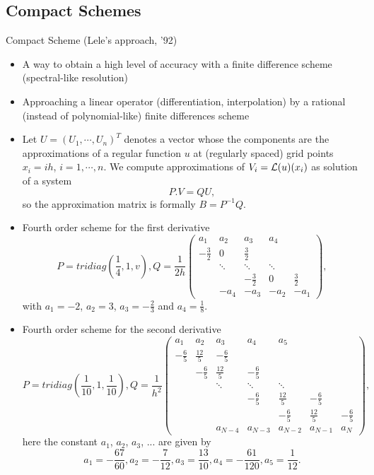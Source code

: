 \documentclass[hyperref={pdfpagemode=FullScreen},9pt]{beamer}
\begin{document}
 \subsection{Compact Schemes}
 \begin{frame}
 \begin{block}{Compact Scheme (Lele's approach, '92)}
 \begin{itemize}
 \item A way to obtain a high level of accuracy with a finite difference scheme
 (spectral-like resolution)
 \item Approaching a linear operator (differentiation, interpolation) by a rational (instead of polynomial-like) finite differences scheme
 \item Let $U=(U_1,\cdots,U_n)^T$ denotes a vector whose the components are the approximations of a regular function $u$ at (regularly spaced) grid points $x_i=ih$, $i=1,\cdots, n$.  We compute approximations of $V_i={\cal L}(u)(x_i)$ as solution of a system
$$
P . V= Q U,
$$
so the approximation matrix is formally $B=P^{-1}Q$.
\end{itemize}
 \end{block}
 \end{frame}
 \begin{frame}

 \begin{itemize}
 \item Fourth order scheme for the first derivative
 $$P=tridiag(\frac{1}{4},1,v), Q=\dfrac{1}{2h} \begin{pmatrix}
a_1 & a_2 & a_3 & a_4 &   \\ 
-\frac{3}{2} & 0 & \frac{3}{2} &   &   \\ 
  & \ddots & \ddots & \ddots &   \\ 
  &   & -\frac{3}{2} & 0 & \frac{3}{2} \\ 
  & -a_4 & -a_3 & -a_2 & -a_1
\end{pmatrix}, $$
with $a_1=-2$, $a_2=3$, $a_3=-\frac{2}{3}$ and $a_4=\frac{1}{8}$.
\item Fourth order scheme for the second derivative
$$ P= tridiag(\frac{1}{10},1,\frac{1}{10}), Q = \frac{1}{h^2} \begin{pmatrix}
a_1 & a_2 & a_3 & a_4 & a_5 &   &   \\ 
-\frac{6}{5} & \frac{12}{5} & -\frac{6}{5} &   &   &   &   \\ 
  & -\frac{6}{5} & \frac{12}{5} & -\frac{6}{5} &   &   &   \\ 
  &   & \ddots & \ddots & \ddots &   &   \\ 
  &   &   & -\frac{6}{5} & \frac{12}{5} & -\frac{6}{5} &   \\ 
  &   &   &   & -\frac{6}{5} & \frac{12}{5} & -\frac{6}{5} \\ 
  &   & a_{N-4} & a_{N-3} & a_{N-2} & a_{N-1} & a_N
\end{pmatrix}, $$
here the constant  $a_1$, $a_2$, $a_3$, ... are given by
$$ 
a_1=-\frac{67}{60},   
a_2=-\frac{7}{12},   
a_3=\frac{13}{10},   
a_4=-\frac{61}{120},   
a_5=\frac{1}{12}.   
 $$
\end{itemize}
 \end{frame}
\end{document}
